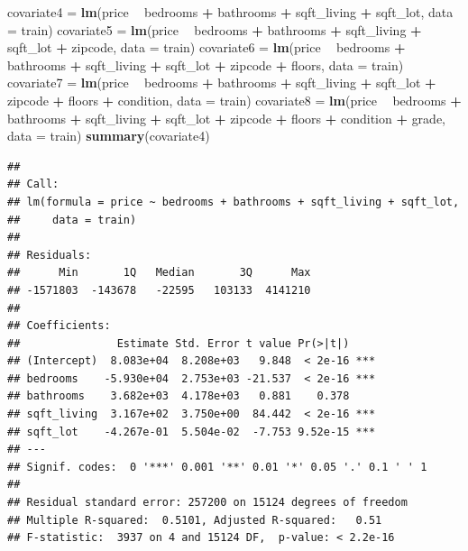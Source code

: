 \documentclass[
]{article}
\newenvironment{Shaded}{\begin{snugshade}}{\end{snugshade}}
\newcommand{\DataTypeTok}[1]{\textcolor[rgb]{0.13,0.29,0.53}{#1}}
\newcommand{\KeywordTok}[1]{\textcolor[rgb]{0.13,0.29,0.53}{\textbf{#1}}}
\newcommand{\NormalTok}[1]{#1}
\newcommand{\OperatorTok}[1]{\textcolor[rgb]{0.81,0.36,0.00}{\textbf{#1}}}
\newcommand{\StringTok}[1]{\textcolor[rgb]{0.31,0.60,0.02}{#1}}
\begin{document}
\begin{Shaded}
\begin{Highlighting}[]
\NormalTok{covariate4 =}\StringTok{ }\KeywordTok{lm}\NormalTok{(price }\OperatorTok{~}\StringTok{ }\NormalTok{bedrooms }\OperatorTok{+}\StringTok{ }\NormalTok{bathrooms }\OperatorTok{+}\StringTok{ }\NormalTok{sqft_living }\OperatorTok{+}\StringTok{ }\NormalTok{sqft_lot, }\DataTypeTok{data =}\NormalTok{ train)}
\NormalTok{covariate5 =}\StringTok{ }\KeywordTok{lm}\NormalTok{(price }\OperatorTok{~}\StringTok{ }\NormalTok{bedrooms }\OperatorTok{+}\StringTok{ }\NormalTok{bathrooms }\OperatorTok{+}\StringTok{ }\NormalTok{sqft_living }\OperatorTok{+}\StringTok{ }\NormalTok{sqft_lot }\OperatorTok{+}\StringTok{ }\NormalTok{zipcode, }\DataTypeTok{data =}\NormalTok{ train)}
\NormalTok{covariate6 =}\StringTok{ }\KeywordTok{lm}\NormalTok{(price }\OperatorTok{~}\StringTok{ }\NormalTok{bedrooms }\OperatorTok{+}\StringTok{ }\NormalTok{bathrooms }\OperatorTok{+}\StringTok{ }\NormalTok{sqft_living }\OperatorTok{+}\StringTok{ }\NormalTok{sqft_lot }\OperatorTok{+}\StringTok{ }\NormalTok{zipcode }\OperatorTok{+}\StringTok{ }\NormalTok{floors, }\DataTypeTok{data =}\NormalTok{ train)}
\NormalTok{covariate7 =}\StringTok{ }\KeywordTok{lm}\NormalTok{(price }\OperatorTok{~}\StringTok{ }\NormalTok{bedrooms }\OperatorTok{+}\StringTok{ }\NormalTok{bathrooms }\OperatorTok{+}\StringTok{ }\NormalTok{sqft_living }\OperatorTok{+}\StringTok{ }\NormalTok{sqft_lot }\OperatorTok{+}\StringTok{ }\NormalTok{zipcode }\OperatorTok{+}\StringTok{ }\NormalTok{floors }\OperatorTok{+}\StringTok{ }\NormalTok{condition, }\DataTypeTok{data =}\NormalTok{ train)}
\NormalTok{covariate8 =}\StringTok{ }\KeywordTok{lm}\NormalTok{(price }\OperatorTok{~}\StringTok{ }\NormalTok{bedrooms }\OperatorTok{+}\StringTok{ }\NormalTok{bathrooms }\OperatorTok{+}\StringTok{ }\NormalTok{sqft_living }\OperatorTok{+}\StringTok{ }\NormalTok{sqft_lot }\OperatorTok{+}\StringTok{ }\NormalTok{zipcode }\OperatorTok{+}\StringTok{ }\NormalTok{floors }\OperatorTok{+}\StringTok{ }\NormalTok{condition }\OperatorTok{+}\StringTok{ }\NormalTok{grade, }\DataTypeTok{data =}\NormalTok{ train)}
\KeywordTok{summary}\NormalTok{(covariate4)}
\end{Highlighting}
\end{Shaded}

\begin{verbatim}
## 
## Call:
## lm(formula = price ~ bedrooms + bathrooms + sqft_living + sqft_lot, 
##     data = train)
## 
## Residuals:
##      Min       1Q   Median       3Q      Max 
## -1571803  -143678   -22595   103133  4141210 
## 
## Coefficients:
##               Estimate Std. Error t value Pr(>|t|)    
## (Intercept)  8.083e+04  8.208e+03   9.848  < 2e-16 ***
## bedrooms    -5.930e+04  2.753e+03 -21.537  < 2e-16 ***
## bathrooms    3.682e+03  4.178e+03   0.881    0.378    
## sqft_living  3.167e+02  3.750e+00  84.442  < 2e-16 ***
## sqft_lot    -4.267e-01  5.504e-02  -7.753 9.52e-15 ***
## ---
## Signif. codes:  0 '***' 0.001 '**' 0.01 '*' 0.05 '.' 0.1 ' ' 1
## 
## Residual standard error: 257200 on 15124 degrees of freedom
## Multiple R-squared:  0.5101, Adjusted R-squared:   0.51 
## F-statistic:  3937 on 4 and 15124 DF,  p-value: < 2.2e-16
\end{verbatim}
\end{document}
